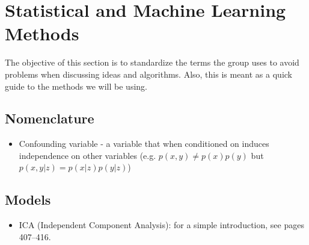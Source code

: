 \documentclass{article}
\begin{document}
\section{Statistical and Machine Learning Methods\label{sec:methods}}

The objective of this section is to standardize the terms the group uses to avoid problems when discussing ideas and algorithms. Also, this is meant as a quick guide to the methods we will be using.

\subsection{Nomenclature\label{sec:method-nomen}}
\begin{itemize}
\item Confounding variable - a variable that when conditioned on induces independence on other variables (e.g. $p(x,y)\neq p(x)p(y)$ but $p(x,y|z) = p(x|z)p(y|z)$)
\end{itemize}


\subsection{Models\label{models}}
\begin{itemize}
\item ICA (Independent Component Analysis): for a simple introduction, see \cite{murphy2012} pages 407--416.
\end{itemize}



\end{document}
